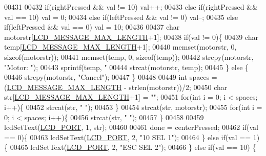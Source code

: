 \begin{DoxyCode}
{{00431 
00432         \textcolor{keywordflow}{if}(rightPressed && val != 10) val++;
00433         \textcolor{keywordflow}{else} \textcolor{keywordflow}{if}(rightPressed && val == 10) val = 0;
00434         \textcolor{keywordflow}{else} \textcolor{keywordflow}{if}(leftPressed && val != 0) val--;
00435         \textcolor{keywordflow}{else} \textcolor{keywordflow}{if}(leftPressed && val == 0) val = 10;
00436 
00437         \textcolor{keywordtype}{char} motorstr[\hyperlink{lcdmsg_8h_abe4c4b70fc6f44ae3680e5b2c68cdd00}{LCD\_MESSAGE\_MAX\_LENGTH}+1];
00438         \textcolor{keywordflow}{if}(val != 0)\{
00439             \textcolor{keywordtype}{char} temp[\hyperlink{lcdmsg_8h_abe4c4b70fc6f44ae3680e5b2c68cdd00}{LCD\_MESSAGE\_MAX\_LENGTH}+1];
00440             memset(motorstr, 0, \textcolor{keyword}{sizeof}(motorstr));
00441             memset(temp, 0, \textcolor{keyword}{sizeof}(temp));
00442             strcpy(motorstr, \textcolor{stringliteral}{"Motor: "});
00443             sprintf(temp, \textcolor{stringliteral}{"%
00444             strcat(motorstr, temp);
00445         \} \textcolor{keywordflow}{else} \{
00446             strcpy(motorstr, \textcolor{stringliteral}{"Cancel"});
00447         \}
00448 
00449         \textcolor{keywordtype}{int} spaces = (\hyperlink{lcdmsg_8h_abe4c4b70fc6f44ae3680e5b2c68cdd00}{LCD\_MESSAGE\_MAX\_LENGTH} - strlen(motorstr))/2;
00450         \textcolor{keywordtype}{char} str[\hyperlink{lcdmsg_8h_abe4c4b70fc6f44ae3680e5b2c68cdd00}{LCD\_MESSAGE\_MAX\_LENGTH}+1] = \textcolor{stringliteral}{""};
00451         \textcolor{keywordflow}{for}(\textcolor{keywordtype}{int} i = 0; i < spaces; i++)\{
00452             strcat(str, \textcolor{stringliteral}{" "});
00453         \}
00454         strcat(str, motorstr);
00455         \textcolor{keywordflow}{for}(\textcolor{keywordtype}{int} i = 0; i < spaces; i++)\{
00456             strcat(str, \textcolor{stringliteral}{" "});
00457         \}
00458 
00459         lcdSetText(\hyperlink{lcdmsg_8h_abcf42bd88b3c36193f301ca25b033875}{LCD\_PORT}, 1, str);
00460 
00461         done = centerPressed;
00462         \textcolor{keywordflow}{if}(val == 0)\{
00463             lcdSetText(\hyperlink{lcdmsg_8h_abcf42bd88b3c36193f301ca25b033875}{LCD\_PORT}, 2, \textcolor{stringliteral}{"10     SEL     1"});
00464         \} \textcolor{keywordflow}{else} \textcolor{keywordflow}{if}(val == 1) \{
00465             lcdSetText(\hyperlink{lcdmsg_8h_abcf42bd88b3c36193f301ca25b033875}{LCD\_PORT}, 2, \textcolor{stringliteral}{"ESC    SEL     2"});
00466         \} \textcolor{keywordflow}{else} \textcolor{keywordflow}{if}(val == 10) \{
}}}
\end{DoxyCode}
